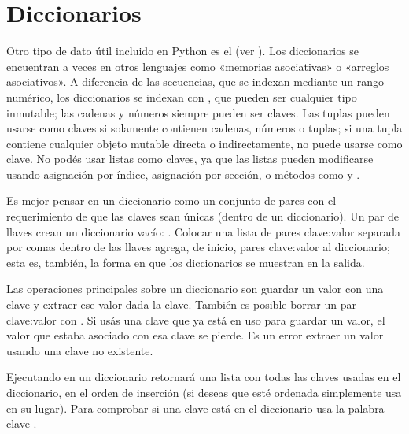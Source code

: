 \documentclass[a4,10pt,spanish]{sphinxmanual}
\begin{document}
\section{Diccionarios}
\label{\detokenize{tutorial/datastructures:dictionaries}}\label{\detokenize{tutorial/datastructures:tut-dictionaries}}
\sphinxAtStartPar
Otro tipo de dato útil incluido en Python es el  (ver ).  Los diccionarios se encuentran a veces en otros lenguajes como «memorias asociativas» o «arreglos asociativos».  A diferencia de las secuencias, que se indexan mediante un rango numérico, los diccionarios se indexan con , que pueden ser cualquier tipo inmutable; las cadenas y números siempre pueden ser claves.  Las tuplas pueden usarse como claves si solamente contienen cadenas, números o tuplas; si una tupla contiene cualquier objeto mutable directa o indirectamente, no puede usarse como clave. No podés usar listas como claves, ya que las listas pueden modificarse usando asignación por índice, asignación por sección, o métodos como  y .

\sphinxAtStartPar
Es mejor pensar en un diccionario como un conjunto de pares  con el requerimiento de que  las claves sean únicas (dentro de un diccionario). Un par de llaves crean un diccionario vacío: \sphinxcode{\sphinxupquote{\{\}}}.  Colocar una lista de pares clave:valor separada por comas dentro de las llaves agrega, de inicio, pares  clave:valor al diccionario; esta es, también, la forma en que los diccionarios se muestran en la salida.

\sphinxAtStartPar
Las operaciones principales sobre un diccionario son guardar un valor con una clave y extraer ese valor dada la clave.  También es posible borrar un par clave:valor con .  Si usás una clave que ya está en uso para guardar un valor, el valor que estaba asociado con esa clave se pierde.  Es un error extraer un valor usando una clave no existente.

\sphinxAtStartPar
Ejecutando  en un diccionario retornará una lista con todas las claves usadas en el diccionario, en el orden de inserción (si deseas que esté ordenada simplemente usa  en su lugar). Para comprobar si una clave está en el diccionario usa la palabra clave .
\end{document}
